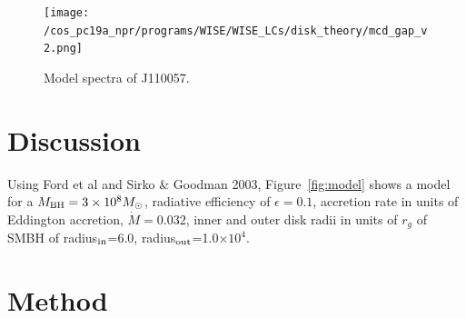 \documentclass{nature}
\begin{document}
\begin{figure}
  \texttt{[image: /cos\_pc19a\_npr/programs/WISE/WISE\_LCs/disk\_theory/mcd\_gap\_v2.png]}
  \centering
  \caption[]{Model spectra of J110057. }
  \label{fig:J110057_diskmodel}
\end{figure}
\section{Discussion}   %
Using Ford et al and Sirko \& Goodman 2003, 
Figure~\ref{fig:model} shows a model for a $M_{\rm BH}=3\times 10^{8} M_{\odot}$, 
radiative efficiency of $\epsilon=0.1$, accretion rate in units of Eddington accretion, 
$\dot{M}=0.032$, inner and outer disk radii in units of $r_g$ of SMBH of 
radius$_{\rm in}$=6.0, radius$_{\rm out}$=1.0$\times 10^{4}$. 
\section{Method}






\end{document}
